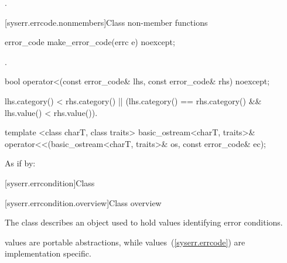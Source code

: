 \begin{itemdescr}
\pnum
\returns {}.
\end{itemdescr}

[syserr.errcode.nonmembers]{Class  non-member functions}

\begin{itemdecl}
error_code make_error_code(errc e) noexcept;
\end{itemdecl}

\begin{itemdescr}
\pnum
\returns {}.
\end{itemdescr}

%
%
\begin{itemdecl}
bool operator<(const error_code& lhs, const error_code& rhs) noexcept;
\end{itemdecl}

\begin{itemdescr}
\pnum
\returns
\begin{codeblock}
lhs.category() < rhs.category() ||
(lhs.category() == rhs.category() && lhs.value() < rhs.value()).
\end{codeblock}
\end{itemdescr}

%
%
\begin{itemdecl}
template <class charT, class traits>
  basic_ostream<charT, traits>&
    operator<<(basic_ostream<charT, traits>& os, const error_code& ec);
\end{itemdecl}

\begin{itemdescr}
\pnum
\effects
As if by: 
\end{itemdescr}


[syserr.errcondition]{Class }

[syserr.errcondition.overview]{Class  overview}

\pnum
The class  describes an object used to hold values identifying
error conditions. \begin{note}  values are portable abstractions,
while  values~(\ref{syserr.errcode}) are implementation specific. \end{note}

